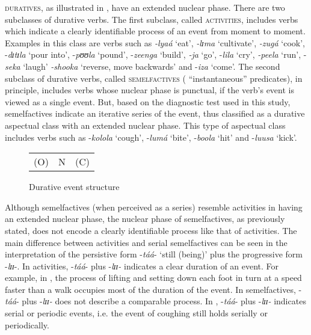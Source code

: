 \documentclass[output=paper,newtxmath,modfonts,nonflat,draftmode]{langsci/langscibook}
\begin{document}
\textsc{duratives}, as illustrated in , have an extended nuclear phase. There are two subclasses of durative verbs. The first subclass, called \textsc{activities}, includes verbs which indicate a clearly identifiable process of an event from moment to moment. Examples in this class are verbs such as \textit{-lyaá} ‘eat’, \textit{-lɪma} ‘cultivate’, \textit{-zugá} ‘cook’, -\textit{dɪtɪla} ‘pour into’, -\textit{pʊʊla} ‘pound’, -\textit{zeenga} ‘build’, \textit{-ja} ‘go’, -\textit{lila} ‘cry’, \textit{-peela} ‘run’, -\textit{seka} ‘laugh’ \textit{-shooka} ‘reverse, move backwards’ and -\textit{iza} ‘come’. The second subclass of durative verbs, called \textsc{semelfactives} ( ``instantaneous'' predicates), in principle, includes verbs whose nuclear phase is punctual, if the verb’s event is viewed as a single event. But, based on the diagnostic test used in this study, semelfactives indicate an iterative series of the event, thus classified as a durative aspectual class with an extended nuclear phase. This type of aspectual class includes verbs such as -\textit{kolola} ‘cough’, -\textit{lumá} ‘bite’, -\textit{boola} ‘hit’ and -\textit{luusa} ‘kick’. 

\begin{figure}
\caption{Durative event structure}
\label{fig:kanijo:6}
\begin{tabular}{c|c|c}
\cline{1-3}
(O) & N & (C)\\
\cline{1-3}
\end{tabular}
\end{figure} 

Although semelfactives (when perceived as a series) resemble activities in having an extended nuclear phase, the nuclear phase of semelfactives, as previously stated, does not encode a clearly identifiable process like that of activities. The main difference between activities and serial semelfactives can be seen in the interpretation of the persistive form -\textit{táá}- ‘still (being)’ plus the progressive form -\textit{lɪɪ}-. In activities, -\textit{táá}- plus -\textit{lɪɪ-} indicates a clear duration of an event. For example, in , the process of lifting and setting down each foot in turn at a speed faster than a walk occupies most of the duration of the event. In semelfactives, -\textit{táá}- plus -\textit{lɪɪ-} does not describe a comparable process. In , -\textit{táá}- plus -\textit{lɪɪ-} indicates serial or periodic events, i.e. the event of coughing still holds serially or periodically.
\end{document}
